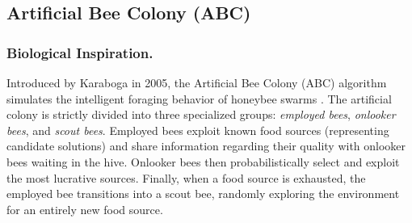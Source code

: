 
\subsection{Artificial Bee Colony (ABC)}

\subsubsection{Biological Inspiration.}
Introduced by Karaboga in 2005, the Artificial Bee Colony (ABC) algorithm simulates the intelligent foraging behavior of honeybee swarms \autocite{Karaboga2007}. The artificial colony is strictly divided into three specialized groups: \textit{employed bees}, \textit{onlooker bees}, and \textit{scout bees}. Employed bees exploit known food sources (representing candidate solutions) and share information regarding their quality with onlooker bees waiting in the hive. Onlooker bees then probabilistically select and exploit the most lucrative sources. Finally, when a food source is exhausted, the employed bee transitions into a scout bee, randomly exploring the environment for an entirely new food source.

